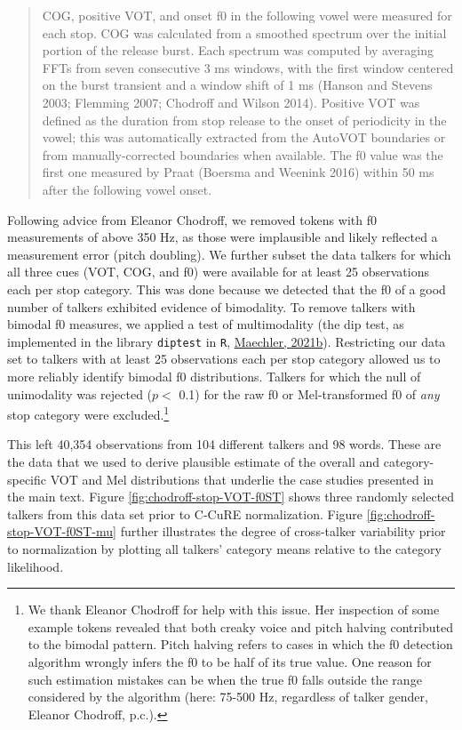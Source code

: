 \documentclass[
  11pt,
  english,
  man,floatsintext]{apa6}
\begin{document}
\begin{quote}
COG, positive VOT, and onset f0 in the following vowel were measured for each stop. COG was calculated
from a smoothed spectrum over the initial portion of the release burst. Each spectrum was computed by averaging
FFTs from seven consecutive 3 ms windows, with the first window centered on the burst transient and
a window shift of 1 ms (Hanson and Stevens 2003; Flemming 2007; Chodroff and Wilson 2014). Positive VOT
was defined as the duration from stop release to the onset of periodicity in the vowel; this was automatically
extracted from the AutoVOT boundaries or from manually-corrected boundaries when available. The
f0 value was the first one measured by Praat (Boersma and Weenink 2016) within 50 ms after the following
vowel onset.
\end{quote}

Following advice from Eleanor Chodroff, we removed tokens with f0 measurements of above 350 Hz, as those were implausible and likely reflected a measurement error (pitch doubling). We further subset the data talkers for which all three cues (VOT, COG, and f0) were available for at least 25 observations each per stop category. This was done because we detected that the f0 of a good number of talkers exhibited evidence of bimodality. To remove talkers with bimodal f0 measures, we applied a test of multimodality (the dip test, as implemented in the library \texttt{diptest} in \texttt{R}, \protect\hyperlink{ref-maechler2021}{Maechler, 2021b}). Restricting our data set to talkers with at least 25 observations each per stop category allowed us to more reliably identify bimodal f0 distributions. Talkers for which the null of unimodality was rejected (\(p<\) 0.1) for the raw f0 or Mel-transformed f0 of \emph{any} stop category were excluded.\footnote{We thank Eleanor Chodroff for help with this issue. Her inspection of some example tokens revealed that both creaky voice and pitch halving contributed to the bimodal pattern. Pitch halving refers to cases in which the f0 detection algorithm wrongly infers the f0 to be half of its true value. One reason for such estimation mistakes can be when the true f0 falls outside the range considered by the algorithm (here: 75-500 Hz, regardless of talker gender, Eleanor Chodroff, p.c.).}

This left 40,354 observations from 104 different talkers and 98 words. These are the data that we used to derive plausible estimate of the overall and category-specific VOT and Mel distributions that underlie the case studies presented in the main text. Figure \ref{fig:chodroff-stop-VOT-f0ST} shows three randomly selected talkers from this data set prior to C-CuRE normalization. Figure \ref{fig:chodroff-stop-VOT-f0ST-mu} further illustrates the degree of cross-talker variability prior to normalization by plotting all talkers' category means relative to the category likelihood.
\end{document}
